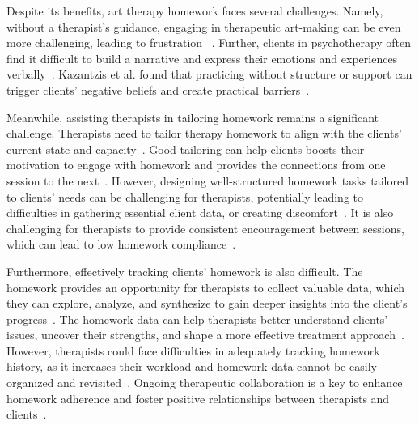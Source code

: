 Despite its benefits, art therapy homework faces several challenges.
Namely, without a therapist's guidance, engaging in therapeutic art-making can be even more challenging, leading to frustration ~\cite{du2024deepthink}.
Further, clients in psychotherapy often find it difficult to build a narrative and express their emotions and experiences verbally~\cite{pennebaker1999forming,mayer2011emotional,kim2024mindfuldiary}. Kazantzis et al. found that practicing without structure or support can trigger clients' negative beliefs and create practical barriers~\cite{kazantzis2022comprehensive}.

Meanwhile, assisting therapists in tailoring homework remains a significant challenge.
Therapists need to tailor therapy homework to align with the clients' current state and capacity~\cite{Oewel_2024}. 
Good tailoring can help clients boosts their motivation to engage with homework and provides the connections from one session to the next~\cite{Oewel_2024,katz2023assigning}.
However, designing well-structured homework tasks tailored to clients' needs can be challenging for therapists, potentially leading to difficulties in gathering essential client data, or creating discomfort~\cite{kazantzis2007handbook, Oewel_2024}.
It is also challenging for therapists to provide consistent encouragement between sessions, which can lead to low homework compliance~\cite{dryden2011cbt}.

Furthermore, effectively tracking clients' homework is also difficult.
The homework provides an opportunity for therapists to collect valuable data, which they can explore, analyze, and synthesize to gain deeper insights into the client's progress~\cite{kazantzis2007handbook}.
The homework data can help therapists better understand clients' issues, uncover their strengths, and shape a more effective treatment approach~\cite{kazantzis2007handbook,gereb2022online}.
However, therapists could face difficulties in adequately tracking homework history, as it increases their workload and homework data cannot be easily organized and revisited~\cite{richards2018impact, gereb2022online,peretz2023machine}.
Ongoing therapeutic collaboration is a key to enhance homework adherence and foster positive relationships between therapists and clients~\cite{thomas2008evaluating, Ali2017_face2emoji}.






